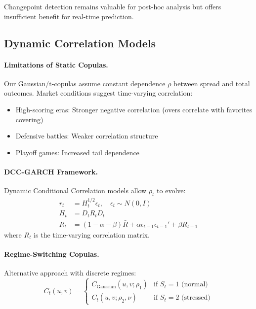 Changepoint detection remains valuable for post-hoc analysis but offers insufficient benefit for real-time prediction.

\subsection{Dynamic Correlation Models}

\paragraph{Limitations of Static Copulas.}
Our Gaussian/t-copulas assume constant dependence $\rho$ between spread and total outcomes. Market conditions suggest time-varying correlation:
\begin{itemize}
  \item High-scoring eras: Stronger negative correlation (overs correlate with favorites covering)
  \item Defensive battles: Weaker correlation structure
  \item Playoff games: Increased tail dependence
\end{itemize}

\paragraph{DCC-GARCH Framework.}
Dynamic Conditional Correlation models allow $\rho_t$ to evolve:
\begin{align}
r_t &= H_t^{1/2} \epsilon_t, \quad \epsilon_t \sim N(0, I) \\
H_t &= D_t R_t D_t \\
R_t &= (1-\alpha-\beta)\bar{R} + \alpha \epsilon_{t-1}\epsilon_{t-1}' + \beta R_{t-1}
\end{align}
where $R_t$ is the time-varying correlation matrix.

\paragraph{Regime-Switching Copulas.}
Alternative approach with discrete regimes:
\begin{equation}
C_t(u,v) = \begin{cases}
C_{\text{Gaussian}}(u,v; \rho_1) & \text{if } S_t = 1 \text{ (normal)} \\
C_{t}(u,v; \rho_2, \nu) & \text{if } S_t = 2 \text{ (stressed)}
\end{cases}
\end{equation}

